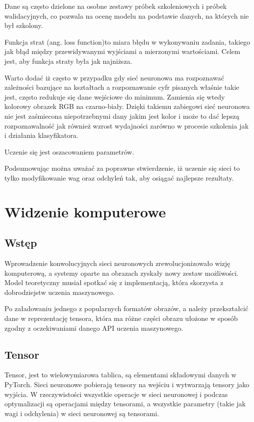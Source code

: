 \documentclass[brudnopis]{xmgr}
\begin{document}
Dane są często dzielone na osobne zestawy próbek szkoleniowych i próbek walidacyjnych, co pozwala na ocenę modelu na podstawie danych, na których nie był szkolony.
 
Funkcja strat (ang. loss function)to miara błędu w wykonywaniu zadania, takiego jak błąd między przewidywanymi wyjściami a mierzonymi wartościami. Celem jest, aby funkcja straty była jak najniższa.

Warto dodać iż często w przypadku gdy sieć neuronowa ma rozpoznawać zależności bazujące na kształtach a rozpoznawanie cyfr pisanych właśnie takie jest, często redukuje się dane wejściowe do minimum. Zamienia się wtedy kolorowy obrazek RGB na czarno-biały. Dzięki takiemu zabiegowi sieć neuronowa nie jest zaśmiecona niepotrzebnymi dany jakim jest kolor i może to dać lepszą rozpoznawalność jak również wzrost wydajności zarówno w procesie szkolenia jak i działania klasyfikatora.  

Uczenie się jest oszacowaniem parametrów.   

Podsumowując można uważać za  poprawne stwierdzenie, iż uczenie się sieci to tylko modyfikowanie wag oraz odchyleń tak, aby osiągać najlepsze rezultaty.


\chapter{Widzenie komputerowe  }

\section{Wstęp\label{s:dsssl}}
Wprowadzenie konwolucyjnych sieci neuronowych zrewolucjonizowało wizję komputerową, a systemy oparte na obrazach zyskały nowy zestaw możliwości. Model teoretyczny musiał spotkać się z implementacją, która skorzysta z dobrodziejstw uczenia maszynowego.

Po załadowaniu jednego  z popularnych formatów obrazów, a należy przekształcić dane w reprezentację tensora, która ma różne części obrazu ułożone w sposób zgodny z oczekiwaniami danego API uczenia maszynowego.

\section{Tensor\label{s:dsssl}}
Tensor, jest to wielowymiarowa tablica, są elementami składowymi danych w PyTorch. Sieci neuronowe pobierają tensory na wejściu i wytwarzają tensory jako wyjścia. W rzeczywistości wszystkie operacje w sieci neuronowej i podczas optymalizacji są operacjami między tensorami, a wszystkie parametry (takie jak wagi i odchylenia) w sieci neuronowej są tensorami.
\end{document}
